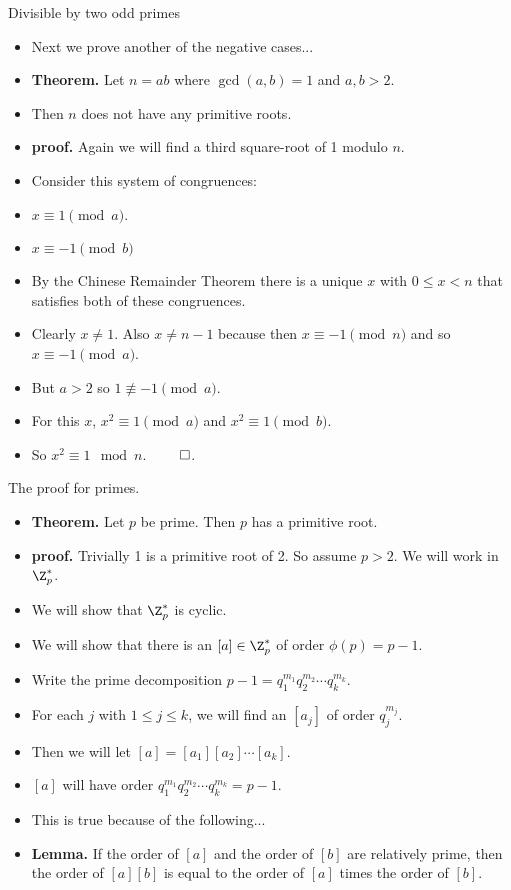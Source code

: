 \documentclass{beamer}
\begin{document}
\begin{frame}{Divisible by two odd primes}

\begin{itemize}
  \item Next we prove another of the negative cases...
  \item \textbf{Theorem.} Let $n=ab$ where $\gcd(a,b)=1$ and $a,b>2$.
  \item Then $n$ does not have any primitive roots.
  \item \textbf{proof.} Again we will find a third square-root of 1 modulo $n$.
  \item Consider this system of congruences:
  \item $x\equiv 1 \pmod a$.
  \item $x\equiv -1 \pmod b$
  \item By the Chinese Remainder Theorem there is a unique $x$ with $0\leq x < n$
  that satisfies both of these congruences.
  \item Clearly $x\not=1$. Also $x\not=n-1$ because then $x\equiv -1 \pmod n$ and
  so $x\equiv -1 \pmod a$.
  \item But $a>2$ so $1\not\equiv -1 \pmod a$.
  \item For this $x$, $x^2 \equiv 1 \pmod a$ and $x^2 \equiv 1 \pmod b$.
  \item So $x^2\equiv 1 \mod n$. $\qed$.
\end{itemize}

\end{frame}

\begin{frame}{The proof for primes.}

\begin{itemize}
  \item \textbf{Theorem.} Let $p$ be prime. Then $p$ has a primitive root.
  \item \textbf{proof.} Trivially 1 is a primitive root of 2. So assume $p>2$. We will work in $\Z_p^*$.
  \item We will show that $\Z_p^*$ is cyclic.
  \item We will show that there is an $[a]\in\Z_p^*$ of order $\phi(p)=p-1$.
  \item Write the prime decomposition $p-1 = q_1^{m_1}q_2^{m_2}\cdots q_k^{m_k}$.
  \item For each $j$ with $1\leq j \leq k$, we will find an $[a_j]$ of order $q_j^{m_j}$.
  \item Then we will let $[a]=[a_1][a_2]\cdots[a_k]$.
  \item $[a]$ will have order $q_1^{m_1}q_2^{m_2}\cdots q_k^{m_k}=p-1$.
  \item This is true because of the following...
  \item \textbf{Lemma.} If the order of $[a]$ and the order of $[b]$ are relatively prime, then
  the order of $[a][b]$ is equal to the order of $[a]$ times the order of $[b]$.

\end{itemize}

\end{frame}
\end{document}
